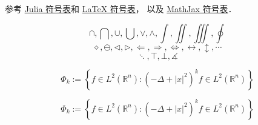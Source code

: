 
参考 \href{https://docs.julialang.org/en/v1/manual/unicode-input/}{Julia 符号表}和 \href{https://oeis.org/wiki/List_of_LaTeX_mathematical_symbols}{LaTeX 符号表}， 以及 \href{http://www.onemathematicalcat.org/MathJaxDocumentation/TeXSyntax.htm#U}{MathJax 符号表}．

\begin{equation}
\cap, \bigcap, \cup, \bigcup, \vee, \wedge, \int, \iint, \iiint, \oint
\end{equation}
\begin{equation}
\diamond, \ominus, \triangleleft, \triangleright, \Longleftarrow, \Longrightarrow, \iff, \leftrightarrow, \updownarrow, \cdots
\end{equation}
\begin{equation}
\ddots, \top, \bot, \measuredangle
\end{equation}

\begin{equation}
\Phi_k := \left\{f \in L^2 (\mathbb{R}^n): (-\Delta + |x|^ 2)^{k} f \in L^2 (\mathbb{R}^n) \right\}
\end{equation}

$$
\Phi_k := \left\{f \in L^2 (\mathbb{R}^n): (-\Delta + |x|^ 2)^{k} f \in L^2 (\mathbb{R}^n) \right\}
$$
